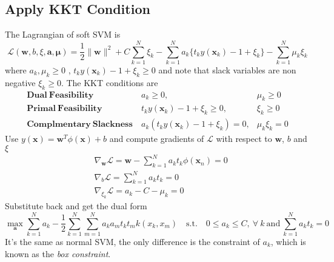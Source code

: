 \documentclass[../main.tex]{subfiles}
\begin{document}
        \subsection{Apply KKT Condition}
            The Lagrangian of soft SVM is
            \[
                \mathcal{L}(\mathbf{w},b,\xi,\mathbf{a},\mathbf{\mu}) = \frac{1}{2} \|\mathbf{w}\|^2 + C \sum_{k=1}^N \xi_k - \sum_{k=1}^N a_k \{ t_k y(\mathbf{x}_k) - 1 + \xi_k\} - \sum_{k=1}^N \mu_k \xi_k
            \]
            where $a_k,\mu_k \geq 0$ , $t_k y(\mathbf{x}_k) - 1 + \xi_k \geq 0$ and note that slack variables are non negative $\xi_k \geq 0$. The KKT conditions are
            \[
                \begin{array}{rll}
                    \mathbf{Dual~Feasibility~} & a_k \geq 0, & \mu_k \geq 0 \\
                    \mathbf{Primal~Feasibility~} & t_k y(\mathbf{x}_k) - 1 + \xi_k \geq 0, & \xi_k \geq 0 \\
                    \mathbf{Complmentary~Slackness~} & a_k (t_k y(\mathbf{x}_k) - 1 + \xi_k) = 0, & \mu_k \xi_k = 0
                \end{array}
            \]
            Use $y(\mathbf{x}) = \mathbf{w}^T \phi(\mathbf{x}) + b$ and compute  gradients of $\mathcal{L}$ with respect to $\mathbf{w}$, $b$ and $\xi$
            \begin{align*}
                & \nabla_{\mathbf{w}} \mathcal{L} = \mathbf{w} - \sum_{k=1}^N a_k t_k \phi(\mathbf{x}_n) = 0 \\
                & \nabla_b \mathcal{L} = \sum_{k=1}^N a_k t_k = 0 \\
                & \nabla_{\xi_k} \mathcal{L} = a_k - C - \mu_k = 0
            \end{align*}
            Substitute back and get the dual form
            \[
                \max_{\mathbf{a}} \sum_{k=1}^N a_k - \frac{1}{2} \sum_{k=1}^N \sum_{m=1}^N a_k a_m t_k t_m k(x_k, x_m) \mathrm{\quad s.t. \quad} 0 \leq a_k \leq C,~ \forall~k \mathrm{~and~} \sum_{k=1}^N a_k t_k = 0
            \]
            It's the same as normal SVM, the only difference is the constraint of $a_k$, which is known as the \textit{box constraint}.
\end{document}
